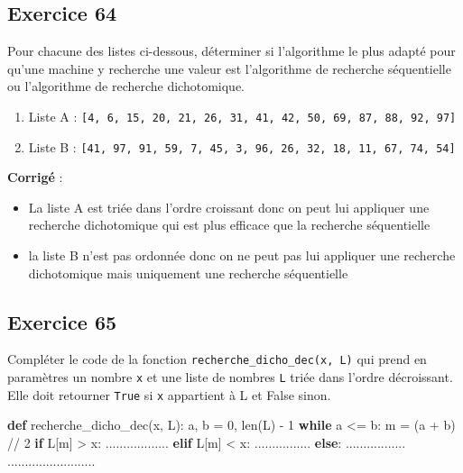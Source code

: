 \documentclass[11pt]{article}
\providecommand{\tightlist}{%
      \setlength{\itemsep}{0pt}\setlength{\parskip}{0pt}}
\newenvironment{Shaded}{}{}
\newcommand{\KeywordTok}[1]{\textcolor[rgb]{0.00,0.44,0.13}{\textbf{{#1}}}}
\newcommand{\DecValTok}[1]{\textcolor[rgb]{0.25,0.63,0.44}{{#1}}}
\newcommand{\NormalTok}[1]{{#1}}
\newcommand{\ControlFlowTok}[1]{\textcolor[rgb]{0.00,0.44,0.13}{\textbf{{#1}}}}
\newcommand{\OperatorTok}[1]{\textcolor[rgb]{0.40,0.40,0.40}{{#1}}}
\newcommand{\BuiltInTok}[1]{{#1}}
\begin{document}
    \hypertarget{exercice-64}{%
\subsection{Exercice 64}\label{exercice-64}}

Pour chacune des listes ci-dessous, déterminer si l'algorithme le plus
adapté pour qu'une machine y recherche une valeur est l'algorithme de
recherche séquentielle ou l'algorithme de recherche dichotomique.

\begin{enumerate}
\def\labelenumi{\arabic{enumi}.}
\tightlist
\item
  Liste A :
  \texttt{{[}4,\ 6,\ 15,\ 20,\ 21,\ 26,\ 31,\ 41,\ 42,\ 50,\ 69,\ 87,\ 88,\ 92,\ 97{]}}
\item
  Liste B :
  \texttt{{[}41,\ 97,\ 91,\ 59,\ 7,\ 45,\ 3,\ 96,\ 26,\ 32,\ 18,\ 11,\ 67,\ 74,\ 54{]}}
\end{enumerate}

    \textbf{Corrigé} :

\begin{itemize}
\tightlist
\item
  La liste A est triée dans l'ordre croissant donc on peut lui appliquer
  une recherche dichotomique qui est plus efficace que la recherche
  séquentielle
\item
  la liste B n'est pas ordonnée donc on ne peut pas lui appliquer une
  recherche dichotomique mais uniquement une recherche séquentielle
\end{itemize}

    \hypertarget{exercice-65}{%
\subsection{Exercice 65}\label{exercice-65}}

Compléter le code de la fonction \texttt{recherche\_dicho\_dec(x,\ L)}
qui prend en paramètres un nombre \texttt{x} et une liste de nombres
\texttt{L} triée dans l'ordre décroissant. Elle doit retourner
\texttt{True} si \texttt{x} appartient à L et False sinon.

\begin{Shaded}
\begin{Highlighting}[]
\KeywordTok{def}\NormalTok{ recherche\_dicho\_dec(x, L):}
\NormalTok{    a, b }\OperatorTok{=} \DecValTok{0}\NormalTok{, }\BuiltInTok{len}\NormalTok{(L) }\OperatorTok{{-}} \DecValTok{1}
    \ControlFlowTok{while}\NormalTok{ a }\OperatorTok{<=}\NormalTok{ b:}
\NormalTok{        m }\OperatorTok{=}\NormalTok{ (a }\OperatorTok{+}\NormalTok{ b) }\OperatorTok{//} \DecValTok{2}
        \ControlFlowTok{if}\NormalTok{ L[m] }\OperatorTok{>}\NormalTok{ x:}
\NormalTok{            ..................}
        \ControlFlowTok{elif}\NormalTok{ L[m] }\OperatorTok{<}\NormalTok{ x:}
\NormalTok{            ................}
        \ControlFlowTok{else}\NormalTok{:}
\NormalTok{            .................}
\NormalTok{    .........................}
\end{Highlighting}
\end{Shaded}
\end{document}
